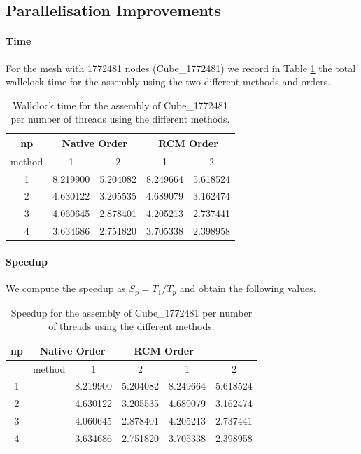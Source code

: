 \documentclass[hidelinks]{article}
\begin{document}
\subsection{Parallelisation Improvements}
\paragraph{Time}
For the mesh with 1772481 nodes (Cube\_1772481) we record in Table \ref{tab:assemblytimes} the total wallclock time for the assembly using the two different methods and orders.

\begin{table}[H]
    \centering
    \begin{tabular}{| c | c c | c c | }
        \hline 
        np & \multicolumn{2}{c|}{Native Order} & \multicolumn{2}{c|}{RCM Order} \\ \hline
        method & 1 & 2 		& 1 & 2 		\\ \hline
        1 & 8.219900 & 5.204082 & 8.249664 & 5.618524   \\ 
        2 & 4.630122 & 3.205535 & 4.689079 & 3.162474   \\
        3 & 4.060645 & 2.878401 & 4.205213 & 2.737441   \\
        4 & 3.634686 & 2.751820 & 3.705338 & 2.398958   \\ \hline

    \end{tabular}
    \caption{Wallclock time for the assembly of Cube\_1772481 per number of threads using the different methods.}\label{tab:assemblytimes}
\end{table}

\paragraph{Speedup} We compute the speedup as $S_p = T_1 / T_p$ and obtain the following values.

\begin{table}[H]
    \centering
    \begin{tabular}{| c c  | c c | c c | }
        \hline 
        np & \multicolumn{2}{c|}{Native Order} & \multicolumn{2}{c|}{RCM Order} \\ \hline
        & method & 1 & 2 		& 1 & 2 		\\ \hline
        1 && 8.219900 & 5.204082 & 8.249664 & 5.618524   \\ 
        2 && 4.630122 & 3.205535 & 4.689079 & 3.162474   \\
        3 && 4.060645 & 2.878401 & 4.205213 & 2.737441   \\
        4 && 3.634686 & 2.751820 & 3.705338 & 2.398958   \\ \hline

    \end{tabular}
    \caption{Speedup for the assembly of Cube\_1772481 per number of threads using the different methods.}\label{tab:assemblyspeedups}
\end{table}
\end{document}
